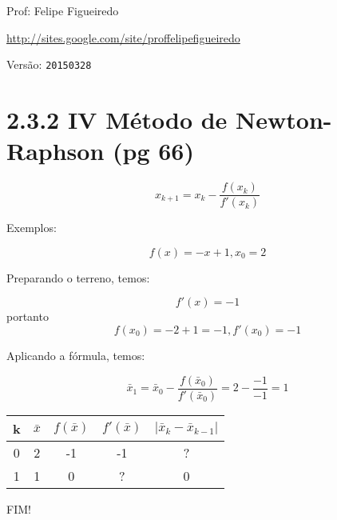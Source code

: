 \documentclass[a4paper]{article}
\begin{document}
\parbox[c]{.825\textwidth}{\raggedright%
{Prof: Felipe Figueiredo\par}
{\url{http://sites.google.com/site/proffelipefigueiredo}\par}
}

Versão: \verb|20150328|



\section*{2.3.2 IV Método de Newton-Raphson (pg 66)}

$$
x_{k+1} = x_k - \frac{f(x_k)}{f'(x_k)}
$$

Exemplos:

\begin{displaymath}
  f(x) = -x+1, x_0=2
\end{displaymath}


Preparando o terreno, temos:

\begin{displaymath}
  f'(x) = -1
\end{displaymath}
portanto
\begin{displaymath}
  f(x_0) = -2+1 = -1, f'(x_0) = -1
\end{displaymath}

Aplicando a fórmula, temos:

\begin{displaymath}
  \bar{x}_1 = \bar{x}_0 - \frac{f(\bar{x}_0)}{f'(\bar{x}_0)} = 2-\frac{-1}{-1} = 1
\end{displaymath}


\begin{center}
  \begin{tabular}{c|c|c|c|c}
    k & $\bar{x}$ & $f(\bar{x})$ & $f'(\bar{x})$ & $|\bar{x}_k - \bar{x}_{k-1}|$\\
    \hline
    0 & 2 & -1 & -1 & ? \\
    \hline
    1 & 1 & 0 & ? & 0 \\
  \end{tabular}
\end{center}

FIM!
\end{document}
